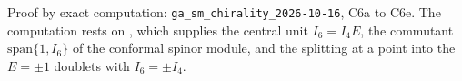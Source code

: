 Proof by exact computation: \texttt{ga\_sm\_chirality\_2026-10-16}, C6a to C6e. The computation rests on , which supplies the central unit $I_6 = I_4E$, the commutant $\mathrm{span}\{1, I_6\}$ of the conformal spinor module, and the splitting at a point into the $E = \pm 1$ doublets with $I_6 = \pm I_4$.
